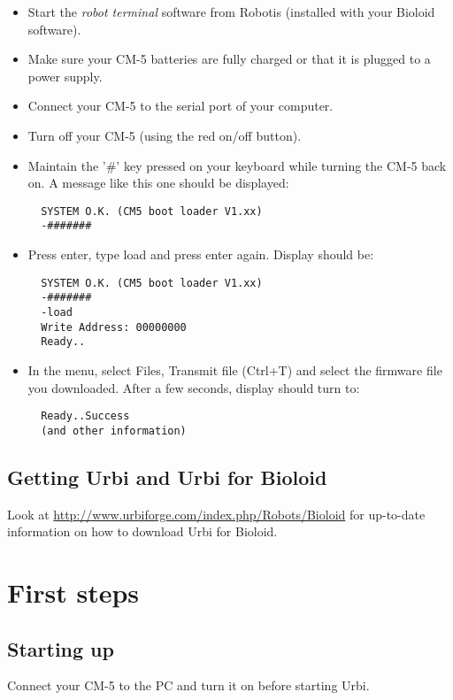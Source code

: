 \begin{itemize}
\item Start the \emph{robot terminal} software from Robotis (installed with
  your Bioloid software).
\item Make sure your CM-5 batteries are fully charged or that it is plugged
  to a power supply.
\item Connect your CM-5 to the serial port of your computer.
\item Turn off your CM-5 (using the red on/off button).
\item Maintain the '\#' key pressed on your keyboard while turning the CM-5
  back on. A message like this one should be displayed:

\begin{verbatim}
  SYSTEM O.K. (CM5 boot loader V1.xx)
  -#######
\end{verbatim}

\item Press enter, type load and press enter again. Display should be:
\begin{verbatim}
  SYSTEM O.K. (CM5 boot loader V1.xx)
  -#######
  -load
  Write Address: 00000000
  Ready..
\end{verbatim}

\item In the menu, select Files, Transmit file (Ctrl+T) and select the
  firmware file you downloaded. After a few seconds, display should turn to:
\begin{verbatim}
  Ready..Success
  (and other information)
\end{verbatim}
\end{itemize}

\subsection{Getting Urbi and Urbi for Bioloid}

Look at \url{http://www.urbiforge.com/index.php/Robots/Bioloid} for
up-to-date information on how to download Urbi for Bioloid.

\section{First steps}

\subsection{Starting up}
Connect your CM-5 to the PC and turn it on before starting Urbi.

